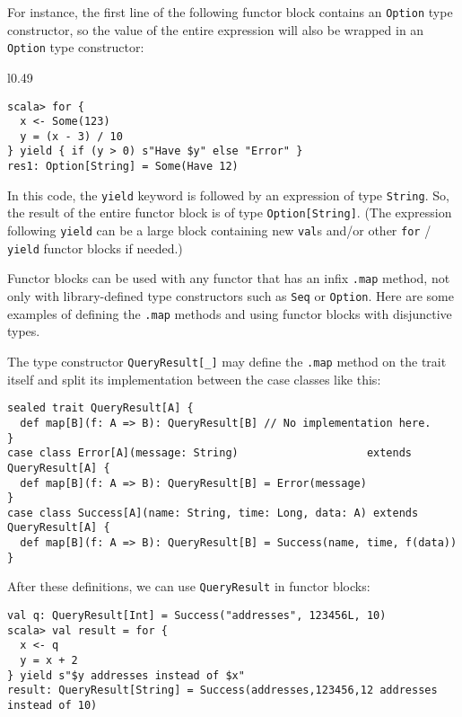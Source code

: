 For instance, the first line of the following functor block contains
an \lstinline!Option! type constructor, so the value of the entire
expression will also be wrapped in an \lstinline!Option! type constructor:

\begin{wrapfigure}{l}{0.49\columnwidth}%
\vspace{-0.4\baselineskip}
\begin{lstlisting}
scala> for {
  x <- Some(123)
  y = (x - 3) / 10
} yield { if (y > 0) s"Have $y" else "Error" }
res1: Option[String] = Some(Have 12)
\end{lstlisting}

\vspace{-1.2\baselineskip}
\end{wrapfigure}%

\noindent In this code, the \lstinline!yield! keyword is followed
by an expression of type \lstinline!String!. So, the result of the
entire functor block is of type \lstinline!Option[String]!. (The
expression following \lstinline!yield! can be a large block containing
new \lstinline!val!s and/or other \lstinline!for! / \lstinline!yield!
functor blocks if needed.)

Functor blocks can be used with any functor that has an infix \lstinline!.map!
method, not only with library-defined type constructors such as \lstinline!Seq!
or \lstinline!Option!. Here are some examples of defining the \lstinline!.map!
methods and using functor blocks with disjunctive types.

The type constructor \lstinline!QueryResult[_]! may define the \lstinline!.map!
method on the trait itself and split its implementation between the
case classes like this:
\begin{lstlisting}
sealed trait QueryResult[A] {
  def map[B](f: A => B): QueryResult[B] // No implementation here.
}
case class Error[A](message: String)                    extends QueryResult[A] {
  def map[B](f: A => B): QueryResult[B] = Error(message)
}
case class Success[A](name: String, time: Long, data: A) extends QueryResult[A] {
  def map[B](f: A => B): QueryResult[B] = Success(name, time, f(data))
}
\end{lstlisting}
After these definitions, we can use \lstinline!QueryResult! in functor
blocks:
\begin{lstlisting}
val q: QueryResult[Int] = Success("addresses", 123456L, 10)
scala> val result = for {
  x <- q
  y = x + 2
} yield s"$y addresses instead of $x"
result: QueryResult[String] = Success(addresses,123456,12 addresses instead of 10)
\end{lstlisting}

